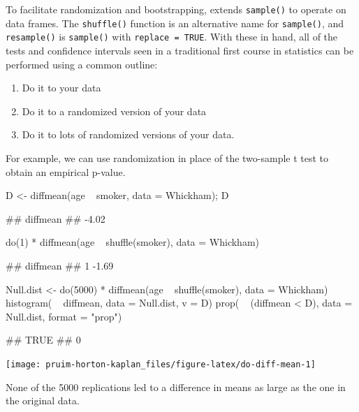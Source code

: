 To facilitate randomization and bootstrapping,  extends
\texttt{sample()} to operate on data frames. The \texttt{shuffle()}
function is an alternative name for \texttt{sample()}, and
\texttt{resample()} is \texttt{sample()} with \texttt{replace\ =\ TRUE}.
With these in hand, all of the tests and confidence intervals seen in a
traditional first course in statistics can be performed using a common
outline:

\begin{enumerate}
\def\labelenumi{\arabic{enumi}.}
\tightlist
\item
  Do it to your data
\item
  Do it to a randomized version of your data
\item
  Do it to lots of randomized versions of your data.
\end{enumerate}

For example, we can use randomization in place of the two-sample t test
to obtain an empirical p-value.

\begin{Schunk}
\begin{Sinput}
D <- diffmean(age ~ smoker, data = Whickham); D 
\end{Sinput}
\begin{Soutput}
## diffmean 
##    -4.02
\end{Soutput}
\begin{Sinput}
do(1) * diffmean(age ~ shuffle(smoker), data = Whickham)
\end{Sinput}
\begin{Soutput}
##   diffmean
## 1    -1.69
\end{Soutput}
\begin{Sinput}
Null.dist <- do(5000) * diffmean(age ~ shuffle(smoker), data = Whickham)
histogram( ~ diffmean, data = Null.dist, v = D)
prop( ~ (diffmean < D), data = Null.dist, format = "prop")
\end{Sinput}
\begin{Soutput}
## TRUE 
##    0
\end{Soutput}


\begin{center}\texttt{[image: pruim-horton-kaplan\_files/figure-latex/do-diff-mean-1]} \end{center}

\end{Schunk}

\noindent
None of the 5000 replications led to a difference in means as large as
the one in the original data.


